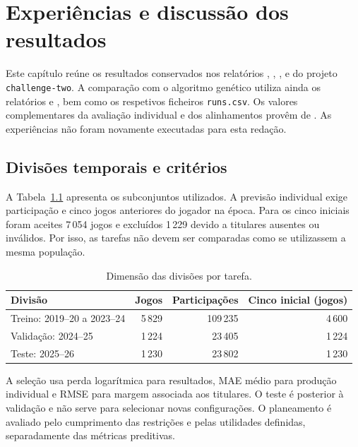 \chapter{Experiências e discussão dos resultados}
\label{chap:experiencias}

Este capítulo reúne os resultados conservados nos relatórios
,
,
,
 e
 do projeto \texttt{challenge-two}.
A comparação com o algoritmo genético utiliza ainda os relatórios
 e
, bem como
os respetivos ficheiros \texttt{runs.csv}.
Os valores complementares da avaliação individual e dos alinhamentos
provêm de .
As experiências não foram novamente executadas para esta redação.

\section{Divisões temporais e critérios}

A Tabela~\ref{tab:divisoes} apresenta os subconjuntos utilizados. A previsão
individual exige participação e cinco jogos anteriores do jogador na
época. Para os cinco iniciais foram aceites 7\,054 jogos e excluídos
1\,229 devido a titulares ausentes ou inválidos. Por isso, as tarefas
não devem ser comparadas como se utilizassem a mesma população.

\begin{table}[htbp]
\centering
\caption{Dimensão das divisões por tarefa.}\label{tab:divisoes}
\begin{tabular}{lrrr}
\toprule
Divisão & Jogos & Participações & Cinco inicial (jogos)\\
\midrule
Treino: 2019--20 a 2023--24 & 5\,829 & 109\,235 & 4\,600\\
Validação: 2024--25 & 1\,224 & 23\,405 & 1\,224\\
Teste: 2025--26 & 1\,230 & 23\,802 & 1\,230\\
\bottomrule
\end{tabular}
\end{table}

A seleção usa perda logarítmica para resultados, MAE médio para produção
individual e RMSE para margem associada aos titulares. O teste é posterior
à validação e não serve para selecionar novas configurações.
O planeamento é avaliado pelo cumprimento das restrições e pelas
utilidades definidas, separadamente das métricas preditivas.

